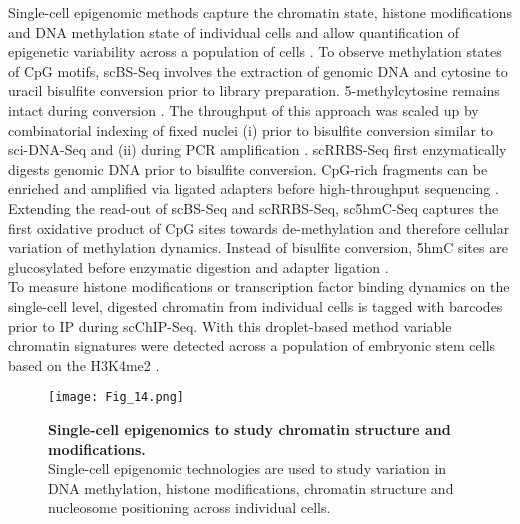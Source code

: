 Single-cell epigenomic methods capture the chromatin state, histone modifications and DNA methylation state of individual cells and allow quantification of epigenetic variability across a population of cells \citep{Clark2016}. To observe methylation states of CpG motifs, \gls{scBS-Seq} involves the extraction of genomic DNA and cytosine to uracil bisulfite conversion prior to library preparation. 5-methylcytosine remains intact during conversion \citep{Smallwood2014, Farlik2015}. The throughput of this approach was scaled up by combinatorial indexing of fixed nuclei (i) prior to bisulfite conversion similar to sci-DNA-Seq and (ii) during PCR amplification \citep{Basque2017}. \Gls{scRRBS-Seq} first enzymatically digests genomic DNA prior to bisulfite conversion. CpG-rich fragments can be enriched and amplified via ligated adapters before high-throughput sequencing \citep{Guo2013}. Extending the read-out of scBS-Seq and scRRBS-Seq, \gls{sc5hmC-Seq} captures the first oxidative product of CpG sites towards de-methylation and therefore cellular variation of methylation dynamics. Instead of bisulfite conversion, 5hmC sites are glucosylated before enzymatic digestion and adapter ligation \citep{Mooijman2016}. \\

To measure histone modifications or transcription factor binding dynamics on the single-cell level, digested chromatin from individual cells is tagged with barcodes prior to \gls{IP} during \gls{scChIP-Seq}. With this droplet-based method variable chromatin signatures were detected across a population of embryonic stem cells based on the \gls{H3K4me2} \citep{Rotem2015}. \\ 

\begin{figure}[!h]
\centering
\texttt{[image: Fig\_14.png]}
\caption[Single-cell epigenomics to study chromatin structure and modifications]{\textbf{Single-cell epigenomics to study chromatin structure and modifications.}\\
Single-cell epigenomic technologies are used to study variation in DNA methylation, histone modifications, chromatin structure and nucleosome positioning across individual cells.}
\label{fig0:scDNA-Seq}
\end{figure}

